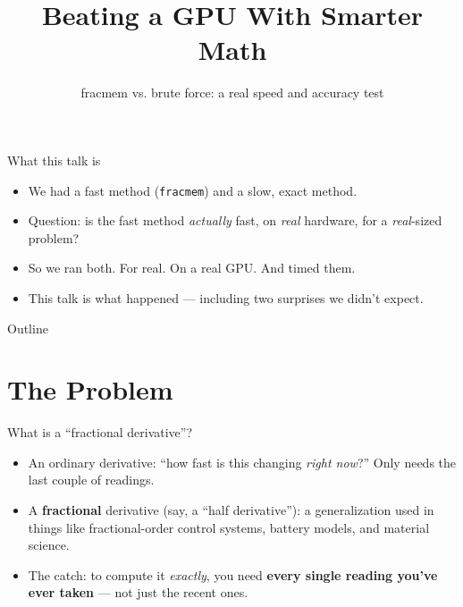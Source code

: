 \documentclass[11pt]{beamer}
\title{Beating a GPU With Smarter Math}
\subtitle{fracmem vs. brute force: a real speed and accuracy test}
\author{}
\date{}
\begin{document}
\begin{frame}
\titlepage
\end{frame}

\begin{frame}{What this talk is}
\begin{itemize}
\item We had a fast method (\texttt{fracmem}) and a slow, exact method.
\item Question: is the fast method \emph{actually} fast, on \emph{real} hardware, for a \emph{real}-sized problem?
\item So we ran both. For real. On a real GPU. And timed them.
\item This talk is what happened --- including two surprises we didn't expect.
\end{itemize}
\end{frame}

\begin{frame}{Outline}
\tableofcontents
\end{frame}

\section{The Problem}

\begin{frame}{What is a ``fractional derivative''?}
\begin{itemize}
\item An ordinary derivative: ``how fast is this changing \emph{right now}?'' Only needs the last couple of readings.
\item A \textbf{fractional} derivative (say, a ``half derivative''): a generalization used in things like fractional-order control systems, battery models, and material science.
\item The catch: to compute it \emph{exactly}, you need \textbf{every single reading you've ever taken} --- not just the recent ones.
\end{itemize}
\end{frame}
\end{document}
